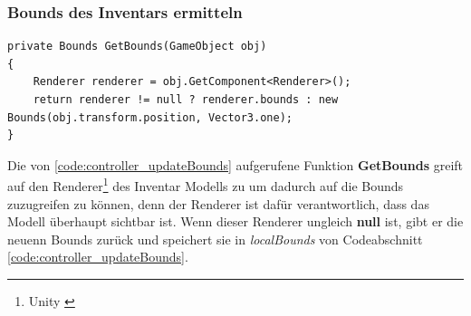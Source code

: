 \subsubsection{Bounds des Inventars ermitteln}
\begin{lstlisting}[style=csharp, caption={Funktion um Bounds zu ermitteln}, label=code:controller_getBounds]
private Bounds GetBounds(GameObject obj)
{
    Renderer renderer = obj.GetComponent<Renderer>();
    return renderer != null ? renderer.bounds : new Bounds(obj.transform.position, Vector3.one);
}
\end{lstlisting}
Die von \ref{code:controller_updateBounds} aufgerufene Funktion \textbf{GetBounds} greift auf den Renderer\footnote{Unity \cite{Renderer}}
des Inventar Modells zu um dadurch auf die Bounds zuzugreifen zu können, denn der Renderer ist dafür verantwortlich,
dass das Modell überhaupt sichtbar ist. Wenn dieser Renderer ungleich \textbf{null} ist, gibt er die neuenn Bounds zurück und speichert
sie in \textit{localBounds} von Codeabschnitt \ref{code:controller_updateBounds}.\\

